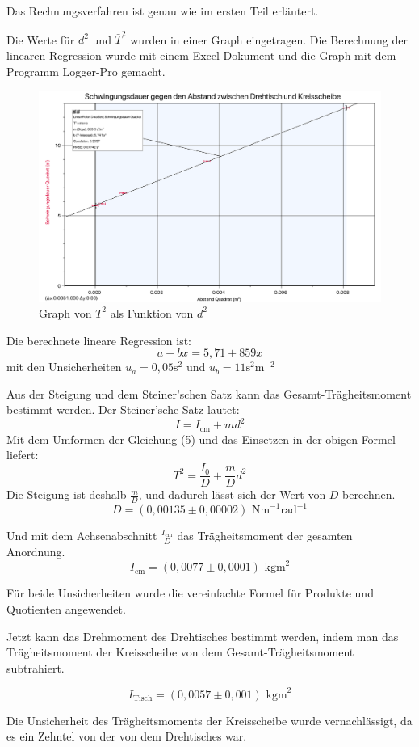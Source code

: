 \documentclass[11pt,a4paper]{article} %
\begin{document}
Das Rechnungsverfahren ist genau wie im ersten Teil erläutert. 

Die Werte für $d^2$ und $\bar{T}^2$ wurden in einer Graph eingetragen. Die Berechnung der linearen Regression wurde mit einem Excel-Dokument und die Graph mit dem Programm Logger-Pro gemacht. 
\begin{figure}[h]
	\centering
	\includegraphics[width=\linewidth]{Graph1}
	\caption{Graph von $T^2$ als Funktion von $d^2$}
\end{figure}
Die berechnete lineare Regression ist:
$$a+bx = 5,71 + 859x$$
mit den Unsicherheiten $u_a = 0,05 \textrm{s}^2$ und $u_b = 11 \textrm{s}^2 \textrm{m}^{-2}$

Aus der Steigung und dem Steiner'schen Satz kann das Gesamt-Trägheitsmoment bestimmt werden. Der Steiner'sche Satz lautet:
$$ I = I_\textrm{cm} + md^2 $$
Mit dem Umformen der Gleichung (5) und das Einsetzen in der obigen Formel liefert:
$$T^2 = \frac{I_0}{D} + \frac{m}{D}d^2$$
Die Steigung ist deshalb $\frac{m}{D}$, und dadurch lässt sich der Wert von $D$ berechnen. 
$$D = (0,00135 \pm 0,00002) \textrm{  Nm}^{-1}\textrm{rad}^{-1}$$

Und mit dem Achsenabschnitt $\frac{I_\textrm{cm}}{D}$ das Trägheitsmoment der gesamten Anordnung. 
$$ I_\textrm{cm} = (0,0077 \pm 0,0001) \textrm{ kgm}^2 $$

Für beide Unsicherheiten wurde die vereinfachte Formel für Produkte und Quotienten angewendet.

Jetzt kann das Drehmoment des Drehtisches bestimmt werden, indem man das Trägheitsmoment der Kreisscheibe von dem Gesamt-Trägheitsmoment subtrahiert. 

$$I_\textrm{Tisch} = (0,0057 \pm 0,001) \textrm{ kgm}^2 $$

Die Unsicherheit des Trägheitsmoments der Kreisscheibe wurde vernachlässigt, da es ein Zehntel von der von dem Drehtisches war. 
\end{document}
